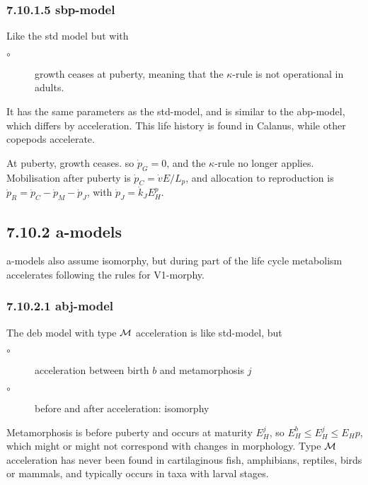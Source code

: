 \subsubsection*{7.10.1.5 sbp-model}
{}
\label{sec_c:sbp}

Like the std model but with 
\begin{description}
  \item[$\circ$] growth ceases at puberty, meaning that the $\kappa$-rule is not operational in adults.   
\end{description}
It has the same parameters as the std-model, and is similar to the abp-model, which differs by acceleration.
This life history is found in Calanus, while other copepods accelerate. 

At puberty, growth ceases. so $\dot{p}_G = 0$, and the $\kappa$-rule no longer applies. 
Mobilisation after puberty is $\dot{p}_C = \dot{v} E/ L_p$, 
  and allocation to reproduction is $\dot{p}_R = \dot{p}_C - \dot{p}_M - \dot{p}_J$, with $\dot{p}_J = \dot{k}_J E_H^p$.

\subsection*{7.10.2 a-models}
{}
\label{sec_c:a-models}

a-models also assume isomorphy, but during part of the life cycle metabolism accelerates following the rules for V1-morphy.

\subsubsection*{7.10.2.1 abj-model}
{}
\label{sec_c:abj}

The {\sc deb} model with type $\cal M$ acceleration is like std-model, but 
\begin{description}
  \item[$\circ$] acceleration between birth $b$ and metamorphosis $j$
	
  \item[$\circ$] before and after acceleration: isomorphy
\end{description}
Metamorphosis is before puberty and occurs at maturity $E_H^j$, so $E_H^b \le E_H^j \le E_Hp$, which might or might not correspond with changes in morphology.
Type $\cal M$ acceleration has never been found in cartilaginous fish, amphibians, reptiles, birds or mammals, 
  and typically occurs in taxa with larval stages.

